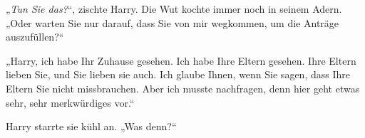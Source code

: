 
„\emph{Tun Sie das?}“, zischte Harry. Die Wut kochte immer noch in seinem Adern. „Oder warten Sie nur darauf, dass Sie von mir wegkommen, um die Anträge auszufüllen?“

„Harry, ich habe Ihr Zuhause gesehen. Ich habe Ihre Eltern gesehen. Ihre Eltern lieben Sie, und Sie lieben sie auch. Ich glaube Ihnen, wenn Sie sagen, dass Ihre Eltern Sie nicht missbrauchen. Aber ich musste nachfragen, denn hier geht etwas sehr, sehr merkwürdiges vor.“

Harry starrte sie kühl an. „Was denn?“

